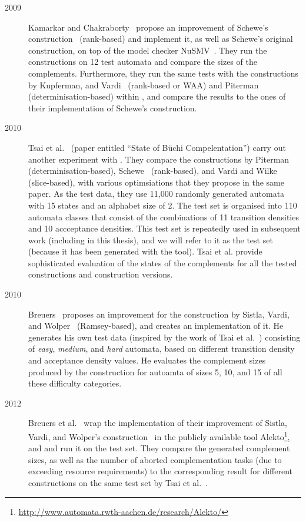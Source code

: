 {\begin{description}
\item[2009] Kamarkar and Chakraborty~\cite{2009_karmarkar} propose an improvement of Schewe's construction~\cite{schewe2009buchi} (rank-based) and implement it, as well as Schewe's original construction, on top of the model checker NuSMV~\cite{1999_nusmv}\cite{2002_nusmv}. They run the constructions on 12 test automata and compare the sizes of the complements. Furthermore, they run the same tests with the constructions by  Kupferman, and Vardi~\cite{Kupferman:2001} (rank-based or WAA) and Piterman~\cite{2007_piterman} (determinisation-based) within \goal, and compare the results to the ones of their implementation of Schewe's construction.

\item[2010] Tsai et al.~\cite{2011_tsai} (paper entitled ``State of Büchi Compelentation'') carry out another experiment with \goal. They compare the constructions by Piterman~\cite{2007_piterman} (determinisation-based), Schewe~\cite{schewe2009buchi} (rank-based), and Vardi and Wilke~\cite{vardi2007automata} (slice-based), with various optimsiations that they propose in the same paper. As the test data, they use 11,000 randomly generated automata with 15 states and an alphabet size of 2. The test set is organised into 110 automata classes that consist of the combinations of 11 transition densities and 10 accceptance densities. This test set is repeatedly used in subsequent work (including in this thesis), and we will refer to it as the \goal{} test set (because it has been generated with the \goal{} tool). Tsai et al. provide sophisticated evaluation of the states of the complements for all the tested constructions and construction versions.

\item[2010] Breuers~\cite{2010_breuers_bsc} proposes an improvement for the construction by Sistla, Vardi, and Wolper~\cite{PrasadSistla1987217} (Ramsey-based), and creates an implementation of it. He generates his own test data (inspired by the work of Tsai et al.~\cite{2011_tsai}) consisting of \textit{easy}, \textit{medium}, and \textit{hard} automata, based on different transition density and acceptance density values. He evaluates the complement sizes produced by the construction for autoamta of sizes 5, 10, and 15 of all these difficulty categories.

\item[2012] Breuers et al.~\cite{2012_breuers} wrap the implementation of their improvement of Sistla, Vardi, and Wolper's construction~\cite{PrasadSistla1987217} in the publicly available tool Alekto\footnote{\url{http://www.automata.rwth-aachen.de/research/Alekto/}}, and and run it on the \goal{} test set. They compare the generated complement sizes, as well as the number of aborted complementation tasks (due to exceeding resource requirements) to the corresponding result for different constructions on the same test set by Tsai et al.~\cite{2011_tsai}.


\end{description}}

